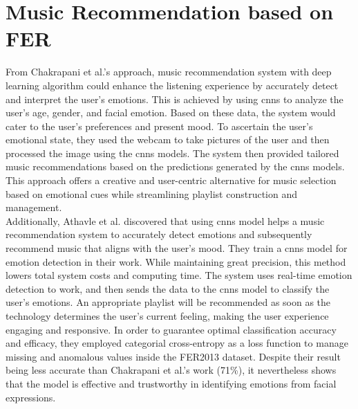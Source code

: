 \section{Music Recommendation based on FER}
From Chakrapani et al.'s approach, music recommendation system with deep learning algorithm could enhance the listening experience by accurately detect and interpret the user's emotions.
This is achieved by using \gls{cnns} to analyze the user's age, gender, and facial emotion. Based on these data, the system would cater to the user's preferences and present mood.
To ascertain the user's emotional state, they used the webcam to take pictures of the user and then processed the image using the \gls{cnns} models.
The system then provided tailored music recommendations based on the predictions generated by the \gls{cnns} models. 
This approach offers a creative and user-centric alternative for music selection based on emotional cues while streamlining playlist construction and management.\citep{mrchakrapanids_2023_music}
\\
\indent Additionally, Athavle et al. discovered that using \gls{cnns} model helps a music recommendation system to accurately detect emotions and subsequently recommend music that aligns with the user's mood.
They train a \gls{cnns} model for emotion detection in their work. 
While maintaining great precision, this method lowers total system costs and computing time.
The system uses real-time emotion detection to work, and then sends the data to the \gls{cnns} model to classify the user's emotions. 
An appropriate playlist will be recommended as soon as the technology determines the user's current feeling, making the user experience engaging and responsive.
In order to guarantee optimal classification accuracy and efficacy, they employed categorial cross-entropy as a loss function to manage missing and anomalous values inside the FER2013 dataset.
Despite their result being less accurate than Chakrapani et al.'s work (71\%), it nevertheless shows that the model is effective and trustworthy in identifying emotions from facial expressions. \citep{athavle_2021_music}
